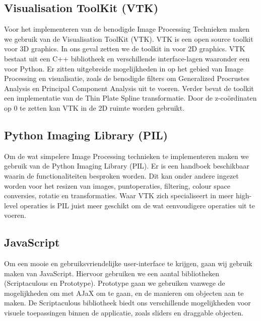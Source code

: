 \subsection{Visualisation ToolKit (VTK)}
Voor het implementeren van de benodigde Image Processing Technieken maken we gebruik van de Visualisation ToolKit (VTK)\cite{vtk}.
VTK is een open source toolkit voor 3D graphics.
In ons geval zetten we de toolkit in voor 2D graphics.
VTK bestaat uit een C++ bibliotheek en verschillende interface-lagen waaronder een voor Python.\cite{vtk2}
Er zitten uitgebreide mogelijkheden in op het gebied van Image Processing en visualisatie, zoals de benodigde filters om Generalized Procrustes Analysis en Principal Component Analysis uit te voeren.
Verder bevat de toolkit een implementatie van de Thin Plate Spline transformatie.
Door de z-co\"{o}rdinaten op 0 te zetten kan VTK in de 2D ruimte worden gebruikt.

\subsection{Python Imaging Library (PIL)}
Om de wat simpelere Image Processing technieken te implementeren maken we gebruik van de Python Imaging Library (PIL)\cite{pil}.
Er is een handboek beschikbaar waarin de functionaliteiten besproken worden.\cite{pilhandbook}
Dit kan onder andere ingezet worden voor het resizen van images, puntoperaties, filtering, colour space conversies, rotatie en transformaties. Waar VTK zich specialiseert in meer high-level operaties is PIL juist meer geschikt om de wat eenvoudigere operaties uit te voeren.

\subsection{JavaScript}
Om een mooie en gebruiksvriendelijke user-interface te krijgen, gaan wij gebruik maken van JavaScript.
Hiervoor gebruiken we een aantal bibliotheken (Scriptaculous\cite{scriptaculous} en Prototype\cite{prototype}).
Prototype gaan we gebruiken vanwege de mogelijkheden om met AJaX om te gaan, en de manieren om objecten aan te maken.
De Scriptaculous bibliotheek biedt ons verschillende mogelijkheden voor visuele toepassingen binnen de applicatie, zoals sliders en draggable objecten.

